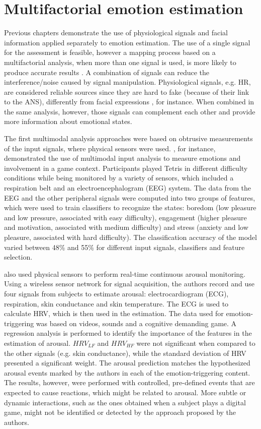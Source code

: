 \chapter{Multifactorial emotion estimation}

Previous chapters demonstrate the use of physiological signals and facial information applied separately to emotion estimation. The use of a single signal for the assessment is feasible, however a mapping process based on a multifactorial analysis, when more than one signal is used, is more likely to produce accurate results \parencite{kukolja2014comparative}. A combination of signals can reduce the interference/noise caused by signal manipulation. Physiological signals, e.g. HR, are considered reliable sources since they are hard to fake (because of their link to the ANS), differently from facial expressions \parencite{Landowska}, for instance. When combined in the same analysis, however, those signals can complement each other and provide more information about emotional states.

The first multimodal analysis approaches were based on obtrusive measurements of the input signals, where physical sensors were used. \textcite{Chanel_2011}, for instance, demonstrated the use of multimodal input analysis to measure emotions and involvement in a game context. Participants played Tetris in different difficulty conditions while being monitored by a variety of sensors, which included a respiration belt and an electroencephalogram (EEG) system. The data from the EEG and the other peripheral signals were computed into two groups of features, which were used to train classifiers to recognize the states: boredom (low pleasure and low pressure, associated with easy difficulty), engagement (higher pleasure and motivation, associated with medium difficulty) and stress (anxiety and low pleasure, associated with hard difficulty). The classification accuracy of the model varied between 48\% and 55\% for different input signals, classifiers and feature selection.

\textcite{grundlehner2009design} also used physical sensors to perform real-time continuous arousal monitoring. Using a wireless sensor network for signal acquisition, the authors record and use four signals from subjects to estimate arousal: electrocardiogram (ECG), respiration, skin conductance and skin temperature. The ECG is used to calculate HRV, which is then used in the estimation. The data used for emotion-triggering was based on videos, sounds and a cognitive demanding game. A regression analysis is performed to identify the importance of the features in the estimation of arousal. $HRV_{LF}$ and $HRV_{HF}$ were not significant when compared to the other signals (e.g. skin conductance), while the standard deviation of HRV presented a significant weight. The arousal prediction matches the hypothesized arousal events marked by the authors in each of the emotion-triggering content. The results, however, were performed with controlled, pre-defined events that are expected to cause reactions, which might be related to arousal. More subtle or dynamic interactions, such as the ones obtained when a subject plays a digital game, might not be identified or detected by the approach proposed by the authors.

